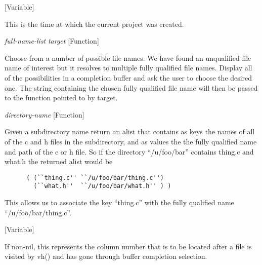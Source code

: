 \vspace{1em}
\noindent
{}
\usebox{\funcname}
 \hfill [Variable]

\begin{doc-string}
This is the time at which the current project was created.
\end{doc-string}

\vspace{1em}
\noindent
{}
\usebox{\funcname}\emph{full-name-list} \emph{target}
 \hfill [Function]

\begin{doc-string}
Choose from a number of possible file names.
We have found an unqualified file name of interest but it resolves to multiple
fully qualified file names.  Display all of the possibilities in a completion
buffer and ask the user to choose the desired one.  The string containing the
chosen fully qualified file name will then be passed to the function pointed
to by target.
\end{doc-string}

\vspace{1em}
\noindent
{}
\usebox{\funcname}\emph{directory-name}
 \hfill [Function]

\begin{doc-string}
Given a subdirectory name return an alist that contains as keys the names
of all of the c and h files in the subdirectory, and as values the the
fully qualified name and path of the c or h file.  So if the directory
``/u/foo/bar'' contains thing.c and what.h the returned alist would be

\small{\begin{verbatim}
      ( (``thing.c'' ``/u/foo/bar/thing.c'')
        (``what.h''  ``/u/foo/bar/what.h'' ) )
\end{verbatim}}

This allows us to associate the key ``thing.c'' with the fully qualified
name ``/u/foo/bar/thing.c''.
\end{doc-string}

\vspace{1em}
\noindent
{}
\usebox{\funcname}
 \hfill [Variable]

\begin{doc-string}
If non-nil, this represents the column number that is to be located after a
file is visited by vh() and has gone through buffer completion selection.
\end{doc-string}

